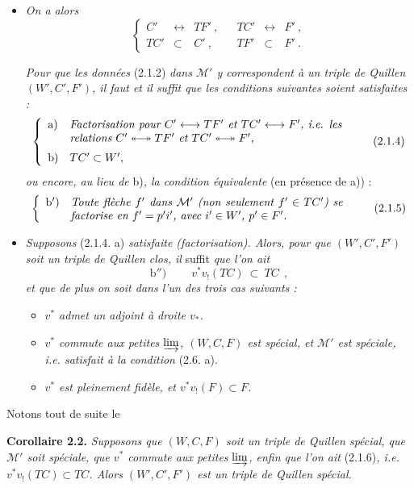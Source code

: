 \documentclass[11pt]{article}
\newcommand{\msp}[1]{\marginpar{\footnotesize [#1]}}
\newcommand{\M}{\mathcal{M}}
\newcommand{\ddarr}{\mathrel{\twoheadleftarrow\joinrel\twoheadrightarrow}}
\begin{document}
\begin{itemize}
\item[1°)] \textit{On a alors}
\[
\left\{
\begin{array}{rclcrcl}
C' & \longleftrightarrow & TF'\ , & & TC' & \longleftrightarrow & F'\ ,\\
TC' & \subset & C'\ , & & TF' & \subset & F'\ .
\end{array}\right.
\tag*{(2.1.3)}
\]

\textit{Pour que les données} (2.1.2) \textit{dans $\M'$ y correspondent à un triple de Quillen $(W',C',F')$, il faut et il suffit que les conditions suivantes soient satisfaites :}
\msp{page 16}
\[
\left\{
\begin{array}{ll}
\text{a)} & \parbox[t]{0.7\textwidth}{\textit{Factorisation pour $C' \longleftrightarrow TF'$ et $TC' \longleftrightarrow F'$, i.e. les relations $C' \ddarr TF'$ et $TC' \ddarr F'$,}}\\[4ex]
\text{b)} & TC' \subset W',
\end{array}\right. %
\tag*{(2.1.4)}
\]
\textit{ou encore, au lieu de} b)\textit{, la condition équivalente} (en présence de a)) :
\[
\left\{
\begin{array}{ll}
\text{b$'$)} & \parbox[t]{0.7\textwidth}{\textit{Toute flèche $f'$ dans $\M'$ (non seulement $f' \in TC'$) se factorise en $f' = p'i'$, avec $i' \in W'$, $p' \in F'$.}}
\end{array}\right.
\tag*{(2.1.5)}
\]
\item[2°)] \textit{Supposons} (2.1.4. a) \textit{satisfaite (factorisation). Alors, pour que $(W',C',F')$ soit un triple de Quillen clos, il} suffit \textit{que l'on ait}
\[
\text{b$''$)}\qquad \boxed{\ v^*v_!(TC)\ \subset\ TC\ }\ ,
\tag*{(2.1.6)}
\]
\textit{et que de plus on soit dans l'un des trois cas suivants :}
\begin{itemize}
\item[A)] \textit{$v^*$ admet un adjoint à droite $v_*$.}
\item[B)] \textit{$v^*$ commute aux petites} $\varinjlim$\textit{, $(W,C,F)$ est spécial, et $\M'$ est spéciale, i.e. satisfait à la condition} (2.6. a).
\item[C)] \textit{$v^*$ est pleinement fidèle, et $v^*v_!(F) \subset F$.}
\end{itemize}
\end{itemize}
Notons tout de suite le

\textbf{Corollaire 2.2.} \textit{Supposons que $(W,C,F)$ soit un triple de Quillen spécial, que $\M'$ soit spéciale, que $v^*$ commute aux petites} $\varinjlim$\textit{, enfin que l'on ait} (2.1.6)\textit{, i.e. $v^*v_!(TC) \subset TC$. Alors $(W',C',F')$ est un triple de Quillen spécial.}
\end{document}
